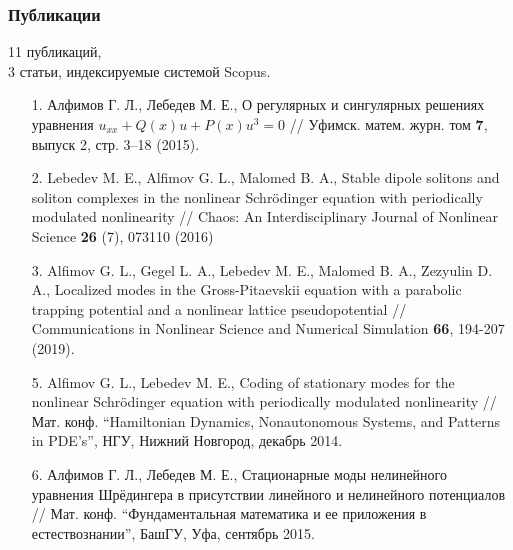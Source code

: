 \documentclass [10pt] {beamer}
\begin{document}
\begin{frame}
	\frametitle{Публикации}
	
	\begin{large}
	{
		\color{ceruleanblue}
		11 публикаций, \\
		3 статьи, индексируемые системой Scopus.
	}	
	\end{large}

	\medskip

	\begin{scriptsize}
	\begin{enumerate}
		\setlength\itemsep{10pt}
		\item[1.] Алфимов Г. Л., Лебедев М. Е., О регулярных и сингулярных решениях уравнения $u_{xx} + Q(x) u + P(x) u^3 = 0$ // Уфимск. матем. журн. том {\bf 7}, выпуск 2, стр. 3--18 (2015).
		\item[2.] Lebedev M. E., Alfimov G. L., Malomed B. A., Stable dipole solitons and soliton complexes in the nonlinear Schr\"odinger equation with periodically modulated nonlinearity // Chaos: An Interdisciplinary Journal of Nonlinear Science {\bf 26} (7), 073110 (2016)
		\item[3.] Alfimov G. L., Gegel L. A., Lebedev M. E., Malomed B. A., Zezyulin D. A., Localized modes in the Gross-Pitaevskii equation with a parabolic trapping potential and a nonlinear lattice pseudopotential // Communications in Nonlinear Science and Numerical Simulation {\bf 66}, 194-207 (2019).
		\item[5.] Alfimov G. L., Lebedev M. E., Coding of stationary modes for the nonlinear Schr\"odinger equation with periodically modulated nonlinearity // Мат. конф. ``Hamiltonian Dynamics, Nonautonomous Systems, and Patterns in PDE’s'', НГУ, Нижний Новгород, декабрь 2014.
		\item[6.] Алфимов Г. Л., Лебедев М. Е., Стационарные моды нелинейного уравнения Шрёдингера в присутствии линейного и нелинейного потенциалов // Мат. конф. ``Фундаментальная математика и ее приложения в естествознании'', БашГУ, Уфа, сентябрь 2015.
	\end{enumerate}
	\end{scriptsize}
\end{frame}
\end{document}
